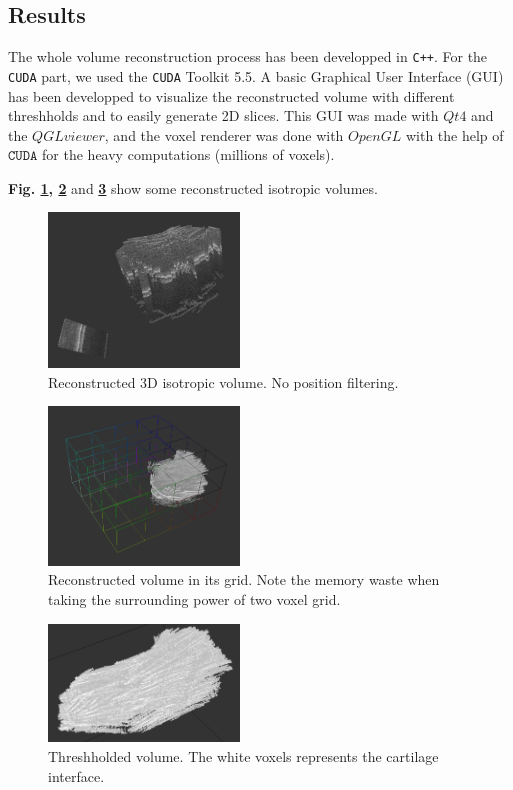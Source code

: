 \documentclass[12pt,journal,compsoc]{IEEEtran}
\begin{document}
\subsection{Results}

The whole volume reconstruction process has been developped in \texttt{C++}.
For the \texttt{CUDA} part, we used the \texttt{CUDA} Toolkit 5.5.
A basic Graphical User Interface (GUI) has been developped to visualize the reconstructed volume with different threshholds and to easily generate 2D slices.
This GUI was made with $Qt4$ and the $QGLviewer$, and the voxel renderer was done with $OpenGL$ with the help of $\texttt{CUDA}$ for the heavy computations (millions of voxels).

\textbf{Fig. \ref{reconstructed_pnn_volume}, \ref{split2}} and \textbf{\ref{results1}} show some reconstructed isotropic volumes.

\begin{figure}[ht!]
\centering
\includegraphics[width=2.0in]{data_1}
\caption{Reconstructed 3D isotropic volume. No position filtering.}
\label{reconstructed_pnn_volume}
\end{figure}

\begin{figure}[ht!]
\centering
\includegraphics[width=2.0in]{split2}
\caption{Reconstructed volume in its grid. Note the memory waste when taking the surrounding power of two voxel grid.}
\label{split2}
\end{figure}

\begin{figure}[ht!]
\centering
\includegraphics[width=2.0in]{results1}
\caption{Threshholded volume. The white voxels represents the cartilage interface.}
\label{results1}
\end{figure}
\end{document}
